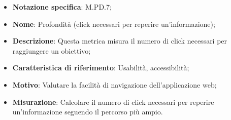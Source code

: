 \begin{itemize}
    \item \textbf{Notazione specifica}: M.PD.7;
    \item \textbf{Nome}: Profondità (click necessari per reperire un'informazione);
    \item \textbf{Descrizione}: Questa metrica misura il numero di click necessari per raggiungere un obiettivo;
    \item \textbf{Caratteristica di riferimento}: Usabilità, accessibilità;
    \item \textbf{Motivo}: Valutare la facilità di navigazione dell'applicazione web;
    \item \textbf{Misurazione}: Calcolare il numero di click necessari per reperire un'informazione seguendo il percorso più ampio.
\end{itemize}
